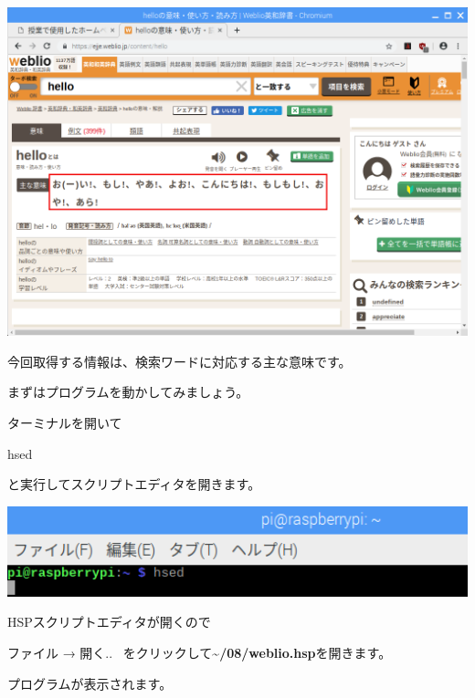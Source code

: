 \documentclass[a4paper,12pt,dvipdfmx]{jarticle}
\begin{document}
\begin{center}
\includegraphics[width=17.006cm]{textbook-img046.png}

\end{center}
今回取得する情報は、検索ワードに対応する主な意味です。

まずはプログラムを動かしてみましょう。

ターミナルを開いて

hsed

と実行してスクリプトエディタを開きます。



\begin{center}
\includegraphics[width=17.057cm]{textbook-img013.png}

\end{center}
\clearpage
HSPスクリプトエディタが開くので

ファイル → 開く..
\ をクリックして\textbf{{\textasciitilde}/08/weblio.hsp}を開きます。

プログラムが表示されます。
\end{document}

